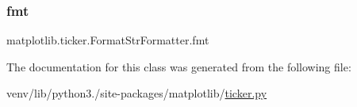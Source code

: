 \subsubsection{\texorpdfstring{fmt}{fmt}}
{\footnotesize\ttfamily matplotlib.\+ticker.\+Format\+Str\+Formatter.\+fmt}



The documentation for this class was generated from the following file\+:\begin{DoxyCompactItemize}
\item 
venv/lib/python3./site-\/packages/matplotlib/\hyperlink{ticker_8py}{ticker.\+py}\end{DoxyCompactItemize}
